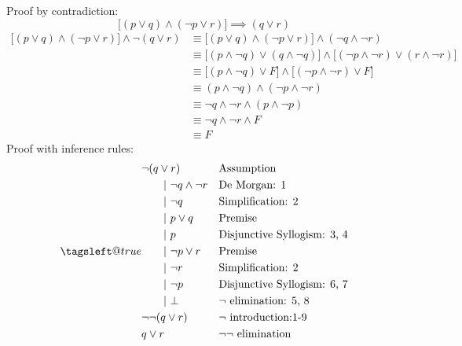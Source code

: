 \documentclass[11pt]{article}
\makeatletter
\newcommand{\leqnomode}{\tagsleft@true}
\newcommand{\tab}[1][30pt]{\hspace*{#1}}
\newcommand{\bracket}[1]{\biggl[#1\biggr]}
\newcommand{\infrule}[2]{&#1 &&\textup{#2}}
\newcommand{\subrule}{\tab[20pt]\vert\ }
\makeatother
\begin{document}
\subsubsection{}
Proof by contradiction:
\begin{equation}
\bracket{(p\lor q) \land (\neg p \lor r)} \implies (q \lor r)
\end{equation}
\begin{align*}
\bracket{(p\lor q) \land (\neg p \lor r)} \land \neg (q \lor r)
&\equiv \bracket{(p\lor q) \land (\neg p \lor r)} \land  (\neg q \land \neg r)
\\ &\equiv \bracket{(p \land \neg q) \lor (q \land \neg q)} \land \bracket{(\neg p \land \neg r) \lor (r \land \neg r)} \tag{Distributive law $\times 2$}
\\ &\equiv \bracket{(p \land \neg q) \lor F} \land \bracket{(\neg p \land \neg r) \lor F}
\\ &\equiv (p \land \neg q) \land (\neg p \land \neg r)
\\ &\equiv \neg q \land \neg r \land (p \land \neg p)
\\ &\equiv \neg q \land \neg r \land F
\\ &\equiv F  \tag*{$\therefore$ Contradiction}
\end{align*}
Proof with inference rules:
\begin{subequations}
\leqnomode
\renewcommand{\theequation}{\arabic{equation}}
\begin{align}
\infrule{\neg(q\lor r)}{Assumption}\\
\infrule{\subrule \neg q \land \neg r}{De Morgan: 1}\\
\infrule{\subrule \neg q}{Simplification: 2}\\
\infrule{\subrule p \lor q}{Premise}\\
\infrule{\subrule p}{Disjunctive Syllogism: 3, 4}\\
\infrule{\subrule \neg p \lor r}{Premise}\\
\infrule{\subrule \neg r}{Simplification: 2}\\
\infrule{\subrule \neg p}{Disjunctive Syllogism: 6, 7}\\
\infrule{\subrule \bot}{$\neg$ elimination: 5, 8}\\
\infrule{\neg \neg (q \lor r)}{$\neg$ introduction:1-9}\\
\infrule{q \lor r}{$\neg \neg$ elimination}
\end{align}
\end{subequations}

\subsection{}
\end{document}
